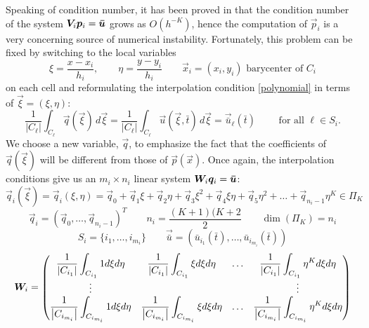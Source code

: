 Speaking of condition number, it has been proved in \cite{abgrall1993eno}
that the condition number of the system $\bm{V}_{i} \bm{p}_{i}=\bm{\bar{u}}$
grows as $O(h^{-K})$, hence the computation of $\vec{p}_{i}$ is a very
concerning source of numerical instability.
Fortunately, this problem can be fixed by switching to the local variables 
\begin{equation*}
\xi=\dfrac{x-x_{i}}{h_{i}}, \qquad \eta=\dfrac{y-y_{i}}{h_{i}} \qquad
\vec{x}_i = (x_{i},y_{i}) \text{ barycenter of } C_{i}
\end{equation*}
on each cell and reformulating the interpolation condition
\eqref{polynomial} in terms of $\vec{\xi}=(\xi,\eta)$:
\begin{equation*}
\dfrac{1}{\left|C_{\ell}\right|}\int_{C_{\ell}} \vec{q}(\vec{\xi}) \, d\vec{\xi}
= \dfrac{1}{\left|C_{\ell}\right|}\int_{C_{\ell}} \vec{u}(\vec{\xi},\bar{t}) \, d\vec{\xi}
= \vec{\bar{u}}_{\ell}(\bar{t}) \qquad \text{ for all } \ell \in S_{i}.
\end{equation*}
We choose a new variable, $\vec{q}$, to emphasize the fact that the coefficients
of $\vec{q}(\vec{\xi})$ will be different from those of $\vec{p}(\vec{x})$.
Once again, the interpolation conditions give us an $m_{i}\times n_{i}$
linear system $\bm{W}_{i} \bm{q}_{i} = \bm{\bar{u}}$:
\begin{equation*}
\vec{q}_{i}(\vec{\xi})=\vec{q}_{i}(\xi,\eta)=\vec{q}_{0}+\vec{q}_{1}\xi+\vec{q}_{2}\eta+\vec{q}_{3}\xi^{2}+\vec{q}_{4}\xi\eta+\vec{q}_{5}\eta^{2}+\dots+\vec{q}_{n_{i}-1}\eta^{K} \in \Pi_{K}
\end{equation*}
\begin{equation*}
\vec{q}_{i}=(\vec{q}_{0},\dots,\vec{q}_{n_{i}-1})^T \qquad
n_i = \frac{(K+1)(K+2}{2} \qquad
\dim(\Pi_K) = n_i
\end{equation*}
\begin{equation*}
S_i = \{ i_1, \dots, i_{m_i} \} \qquad
\vec{\bar{u}}=(\bar{u}_{i_{1}}(\bar{t}),\dots,\bar{u}_{i_{m_{i}}}(\bar{t}))
\end{equation*}
\begin{equation*}
\bm{W}_{i}=\begin{pmatrix}
\dfrac{1}{\left|C_{i_{1}}\right|}\displaystyle\int_{C_{i_{1}}}1 d\xi d\eta&\dfrac{1}{\left|C_{i_{1}}\right|}\displaystyle\int_{C_{i_{1}}}\xi d\xi d\eta&\dots&\dfrac{1}{\left|C_{i_{1}}\right|}\displaystyle\int_{C_{i_{1}}}\eta^{K} d\xi d\eta\\
\vdots&&&\vdots\\
\dfrac{1}{\left|C_{i_{m_{i}}}\right|}\displaystyle\int_{C_{i_{m_{i}}}}1 d\xi d\eta&\dfrac{1}{\left|C_{i_{m_{i}}}\right|}\displaystyle\int_{C_{i_{m_{i}}}}\xi d\xi d\eta&\dots&\dfrac{1}{\left|C_{i_{m_{i}}}\right|}\displaystyle\int_{C_{i_{m_{i}}}}\eta^{K} d\xi d\eta\\
\end{pmatrix}
\end{equation*}
